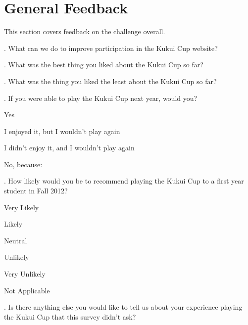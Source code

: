 \section{General Feedback}

This section covers feedback on the challenge overall.

\vspace{5 mm}
. What can we do to improve participation in the Kukui Cup website?

\vspace{5 mm}
. What was the best thing you liked about the Kukui Cup so far?

\vspace{5 mm}
. What was the thing you liked the least about the Kukui Cup so far?

\vspace{5 mm}
. If you were able to play the Kukui Cup next year, would you?

\begin{radiobutton}
	\item Yes
	\item I enjoyed it, but I wouldn't play again
	\item I didn't enjoy it, and I wouldn't play again
	\item No, because: \underline{\hspace{5cm}}
\end{radiobutton}

\vspace{5 mm}
. How likely would you be to recommend playing the Kukui Cup to a first year student in Fall 2012?

\begin{radiobutton}
	\item Very Likely
	\item Likely
	\item Neutral
	\item Unlikely
	\item Very Unlikely
	\item Not Applicable
\end{radiobutton}

\vspace{5 mm}
. Is there anything else you would like to tell us about your experience playing the Kukui Cup that this survey didn't ask?
